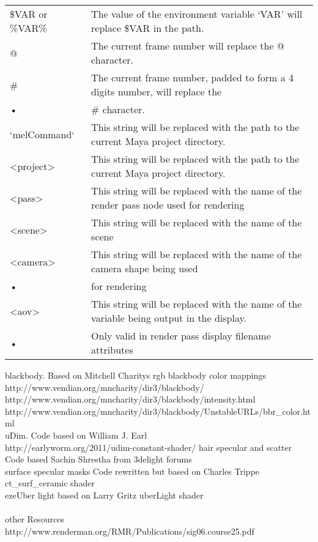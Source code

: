 \documentclass[final,letterpaper,twoside,12pt]{report}
\begin{document}
\begin{tabular}{ll}
\$VAR or \%VAR\% & The value of the environment variable ‘VAR’ will replace \$VAR in the path.\\
@ & The current frame number will replace the @ character.\\
\# & The current frame number, padded to form a 4 digits number, will replace the\\
• & \#
character.\\
`melCommand`  & This string will be replaced with the path to the current Maya project directory.\\
\textless project\textgreater & This string will be replaced with the path to the current Maya project directory.\\
\textless pass\textgreater & This string will be replaced with the name of the render pass node used for rendering\\
\textless scene\textgreater & This string will be replaced with the name of the scene\\
\textless camera\textgreater & This string will be replaced with the name of the camera shape being used\\
• & for rendering\\
\textless aov\textgreater & This string will be replaced with the name of the variable being output in the display.\\
• &Only valid in render pass display filename attributes\\
\end{tabular}



\begin{thebibliography}{99}
 blackbody. Based on Mitchell Charitys rgb blackbody color mappings\\
http://www.vendian.org/mncharity/dir3/blackbody/ \\
http://www.vendian.org/mncharity/dir3/blackbody/intensity.html \\
http://www.vendian.org/mncharity/dir3/blackbody/UnstableURLs/bbr\_color.html \\
 uDim. Code based on William J. Earl\\
http://earlyworm.org/2011/udim-constant-shader/
 hair specular and scatter Code based Sachin Shrestha from 3delight forums\\
 surface specular masks Code rewritten but based on Charles Trippe ct\_surf\_ceramic shader\\
 ezeUber light based on Larry Gritz uberLight shader \\
\\
\noindent other Resources
http://www.renderman.org/RMR/Publications/sig06.course25.pdf\\
\end{thebibliography}
\end{document}
